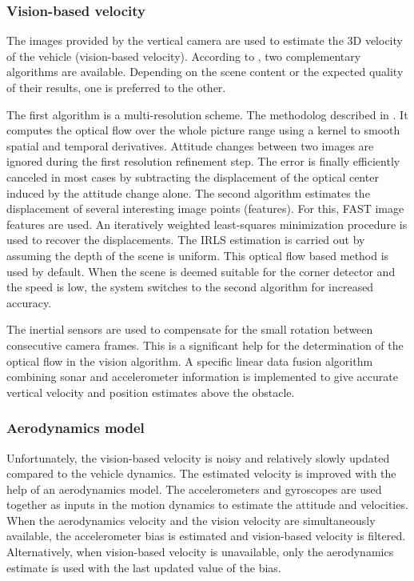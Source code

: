 \subsubsection{Vision-based velocity}
The images provided by the vertical camera are used to estimate the 3D velocity of the vehicle (vision-based velocity).
According to \cite{bristeau2011navigation}, two complementary algorithms are available.
Depending on the scene content or the expected quality of their results, one is preferred to the other.

The first algorithm is a multi-resolution scheme.
The methodolog described in \cite{lukas1981iterative}.
It computes the optical flow over the whole picture range using a kernel to smooth spatial and temporal derivatives.
Attitude changes between two images are ignored during the first resolution refinement step.
The error is finally efficiently canceled in most cases by subtracting the displacement of the optical center induced by the attitude change alone.
The second algorithm estimates the displacement of several interesting image points (features).
For this, FAST image features are used.
An iteratively weighted least-squares minimization procedure is used to recover the displacements.
The IRLS estimation \cite{michaelsen2004pose} is carried out by assuming the depth of the scene is uniform.
This optical flow based method is used by default.
When the scene is deemed suitable for the corner detector and the speed is low, the system switches to the second algorithm for increased accuracy.

The inertial sensors are used to compensate for the small rotation between consecutive camera frames.
This is a significant help for the determination of the optical flow in the vision algorithm.
A specific linear data fusion algorithm combining sonar and accelerometer information is implemented to give accurate vertical velocity and position estimates above the obstacle.

\subsubsection{Aerodynamics model}
Unfortunately, the vision-based velocity is noisy and relatively slowly updated compared to the vehicle dynamics.
The estimated velocity is improved with the help of an aerodynamics model.
The accelerometers and gyroscopes are used together as inputs in the motion dynamics to estimate the attitude and velocities.
When the aerodynamics velocity and the vision velocity are simultaneously available, the accelerometer bias is estimated and vision-based velocity is filtered.
Alternatively, when vision-based velocity is unavailable, only the aerodynamics estimate is used with the last updated value of the bias.

